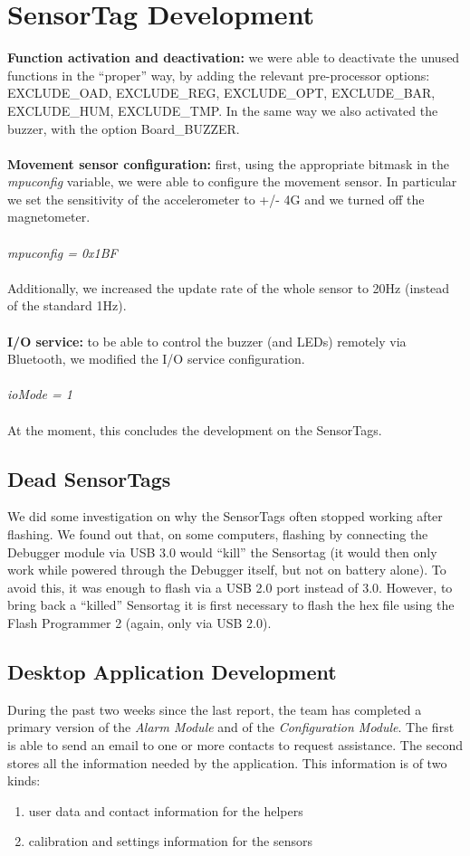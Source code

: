 \documentclass[conference,12pt]{IEEETran}
\begin{document}
\section{SensorTag Development}
\textbf{Function activation and deactivation:} we were able to deactivate the unused functions in the “proper” way, by adding the relevant pre-processor options: EXCLUDE\_OAD, EXCLUDE\_REG, EXCLUDE\_OPT, EXCLUDE\_BAR, EXCLUDE\_HUM, EXCLUDE\_TMP. In the same way we also activated the buzzer, with the option  Board\_BUZZER.\\\\
\textbf{Movement sensor configuration:} first, using the appropriate bitmask in the \textit{mpuconfig} variable, we were able to configure the movement sensor. In particular we set the sensitivity of the accelerometer to +/- 4G and we turned off the magnetometer.\\\\
\textit{mpuconfig = 0x1BF}\\\\
Additionally, we increased the update rate of the whole sensor to 20Hz (instead of the standard 1Hz).\\\\
\textbf{I/O service:} to be able to control the buzzer (and LEDs) remotely via Bluetooth, we modified the I/O service configuration.\\\\
\textit{ioMode = 1}\\\\
At the moment, this concludes the development on the SensorTags.

\subsection{Dead SensorTags}
We did some investigation on why the SensorTags often stopped working after flashing. We found out that, on some computers, flashing by connecting the Debugger module via USB 3.0 would “kill” the Sensortag (it would then only work while powered through the Debugger itself, but not on battery alone). To avoid this, it was enough to flash via a USB 2.0 port instead of 3.0. However, to bring back a “killed” Sensortag it is first necessary to flash the hex file using the Flash Programmer 2 (again, only via USB 2.0).

\subsection{Desktop Application Development}
During the past two weeks since the last report, the team has completed a primary version of the \textit{Alarm Module} and of the \textit{Configuration Module}. The first is able to send an email to one or more contacts to request assistance. The second stores all the information needed by the application. This information is of two kinds:  
\begin{enumerate}
	\item user data and contact information for the helpers
	\item calibration and settings information for the sensors
\end{enumerate}
\end{document}

